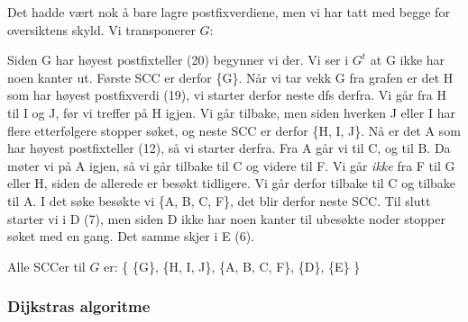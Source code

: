 \begin{eks}
\noindent Det hadde vært nok å bare lagre postfixverdiene, men vi har tatt med begge for oversiktens skyld. Vi transponerer $ G $:

\begin{figure}[H]
\centering
{}
\end{figure}

Siden G har høyest postfixteller (20) begynner vi der. Vi ser i $ G^t $ at G ikke har noen kanter ut. Første SCC er derfor \{G\}. Når vi tar vekk G fra grafen er det H som har høyest postfixverdi (19), vi starter derfor neste dfs derfra. Vi går fra H til I og J, før vi treffer på H igjen. Vi går tilbake, men siden hverken J eller I har flere etterfølgere stopper søket, og neste SCC er derfor \{H, I, J\}. Nå er det A som har høyest postfixteller (12), så vi starter derfra. Fra A går vi til C, og til B. Da møter vi på A igjen, så vi går tilbake til C og videre til F. Vi går \emph{ikke} fra F til G eller H, siden de allerede er besøkt tidligere. Vi går derfor tilbake til C og tilbake til A. I det søke besøkte vi \{A, B, C, F\}, det blir derfor neste SCC. Til slutt starter vi i D (7), men siden D ikke har noen kanter til ubesøkte noder stopper søket med en gang. Det samme skjer i E (6). 

Alle SCCer til $ G $ er: \{ \{G\}, \{H, I, J\}, \{A, B, C, F\}, \{D\}, \{E\} \}
\end{eks}

\subsubsection{\color{red}Dijkstras algoritme}
\label{dijkstra}



